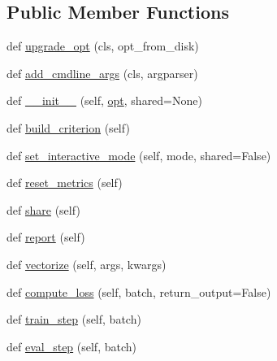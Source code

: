 \subsection*{Public Member Functions}
\begin{DoxyCompactItemize}
\item 
def \hyperlink{classparlai_1_1core_1_1torch__generator__agent_1_1TorchGeneratorAgent_a8bb3183c7de0e8831157536c6ce1751b}{upgrade\+\_\+opt} (cls, opt\+\_\+from\+\_\+disk)
\item 
def \hyperlink{classparlai_1_1core_1_1torch__generator__agent_1_1TorchGeneratorAgent_ad2e2f6361e46785d0b79e4c5031e5710}{add\+\_\+cmdline\+\_\+args} (cls, argparser)
\item 
def \hyperlink{classparlai_1_1core_1_1torch__generator__agent_1_1TorchGeneratorAgent_a60f9613d8d2761569c8862b690b24bce}{\+\_\+\+\_\+init\+\_\+\+\_\+} (self, \hyperlink{classparlai_1_1core_1_1torch__agent_1_1TorchAgent_a785bb920cf8c8afc3e9bf6a8b77e335a}{opt}, shared=None)
\item 
def \hyperlink{classparlai_1_1core_1_1torch__generator__agent_1_1TorchGeneratorAgent_a8f8437dd8d0dc44f941dbc6182121284}{build\+\_\+criterion} (self)
\item 
def \hyperlink{classparlai_1_1core_1_1torch__generator__agent_1_1TorchGeneratorAgent_a8a3c13d2b8988d2a0cbb71f44ae81f52}{set\+\_\+interactive\+\_\+mode} (self, mode, shared=False)
\item 
def \hyperlink{classparlai_1_1core_1_1torch__generator__agent_1_1TorchGeneratorAgent_a7cac9c087d7357d32a7c3bc8fa74930c}{reset\+\_\+metrics} (self)
\item 
def \hyperlink{classparlai_1_1core_1_1torch__generator__agent_1_1TorchGeneratorAgent_ad10e64dd33f1add04ba5bcf36b86c2bf}{share} (self)
\item 
def \hyperlink{classparlai_1_1core_1_1torch__generator__agent_1_1TorchGeneratorAgent_a3ed32722f939a8afd258830b7093fc18}{report} (self)
\item 
def \hyperlink{classparlai_1_1core_1_1torch__generator__agent_1_1TorchGeneratorAgent_a66f36d7201bc1b9a019d3525a5934cf7}{vectorize} (self, args, kwargs)
\item 
def \hyperlink{classparlai_1_1core_1_1torch__generator__agent_1_1TorchGeneratorAgent_a94808a13bba0d5283613acd98516bd3c}{compute\+\_\+loss} (self, batch, return\+\_\+output=False)
\item 
def \hyperlink{classparlai_1_1core_1_1torch__generator__agent_1_1TorchGeneratorAgent_afe2226ddfc838ec27580e3499cc0bae7}{train\+\_\+step} (self, batch)
\item 
def \hyperlink{classparlai_1_1core_1_1torch__generator__agent_1_1TorchGeneratorAgent_ac584268dd08c6fcb0045aa968cad8561}{eval\+\_\+step} (self, batch)
\end{DoxyCompactItemize}
